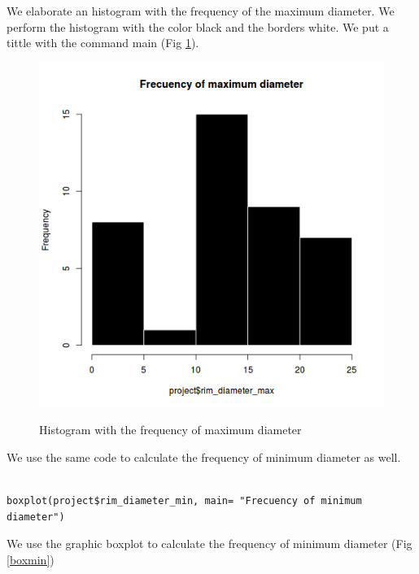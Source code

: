 \documentclass[10pt,a4paper]{article}
\begin{document}
We elaborate an histogram with the frequency of the maximum diameter. We perform the histogram with the color black and the borders white. We put a tittle with the command main (Fig \ref{histomax}).

\begin{figure}[hdp]
\centering
\includegraphics[scale=0.30]{histomax.png}
\label{histomax}
\caption{Histogram with the frequency of maximum diameter}
\end{figure} 

We use the same code to calculate the frequency of minimum diameter as well. 

\begin{verbatim}

boxplot(project$rim_diameter_min, main= "Frecuency of minimum diameter")

\end{verbatim}

We use the graphic boxplot to calculate the frequency of minimum diameter (Fig \ref{boxmin})
\end{document}
